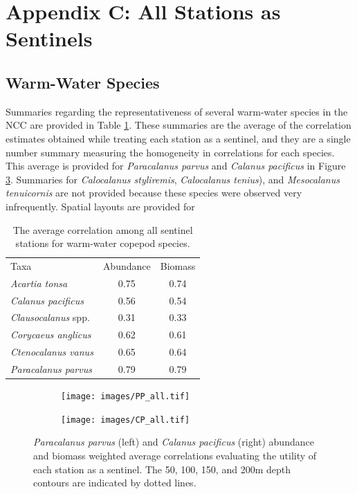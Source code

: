 \documentclass[preprint, authoryear, 12pt]{elsarticle}
\begin{document}
\clearpage
\hypertarget{appendixC}{\section*{Appendix C: All Stations as Sentinels}}
\renewcommand{\thesubsection}{C.1}
\setcounter{figure}{0} 
\renewcommand{\thefigure}{\small C.\arabic{figure}}
\setcounter{table}{0} 
\renewcommand{\thetable}{\small C.\arabic{table}}
\subsection{Warm-Water Species}

Summaries regarding the representativeness of several warm-water species in the NCC are provided in Table \ref{tab:warm_all}. These summaries are the average of the correlation estimates obtained while treating each station as a sentinel, and they are a single number summary measuring the homogeneity in correlations for each species. This average is provided for \textit{Paracalanus parvus} and \textit{Calanus pacificus} in Figure \ref{fig:PP_CP_all}. Summaries for \textit{Calocalanus styliremis}, \textit{Calocalanus tenius}), and \textit{Mesocalanus tenuicornis} are not provided because these species were observed very infrequently. Spatial layouts are provided for 

\begin{table}[ht]
    \footnotesize
    \centering
    \begin{tabular}{lcc}
    \hline
    \hline
           Taxa & Abundance & Biomass \\
           \textit{Acartia tonsa} & 0.75 & 0.74 \\
           \textit{Calanus pacificus} & 0.56 & 0.54 \\
           \textit{Clausocalanus} spp. & 0.31 & 0.33 \\
           \textit{Corycaeus anglicus} & 0.62 & 0.61 \\
           \textit{Ctenocalanus vanus} & 0.65 & 0.64\\
           \textit{Paracalanus parvus} & 0.79 & 0.79 \\
         \hline
    \end{tabular}
    \caption{The average correlation among all sentinel stations for warm-water copepod species.}
    \label{tab:warm_all}
\end{table}


\begin{figure}[ht]
\centering
\begin{subfigure}{0.45\textwidth}
  \centering
  \texttt{[image: images/PP\_all.tif]}
  \caption{}
  \label{fig:PP_all}
\end{subfigure}
\begin{subfigure}{0.45\textwidth}
  \centering
  \texttt{[image: images/CP\_all.tif]}
  \caption{}
  \label{fig:CP_all}
\end{subfigure} 
\caption{\textit{Paracalanus parvus} (left) and \textit{Calanus pacificus} (right) abundance and biomass weighted average correlations evaluating the utility of each station as a sentinel.  The 50, 100, 150, and 200m depth contours are indicated by dotted lines.}
\label{fig:PP_CP_all}
\end{figure}
\end{document}
